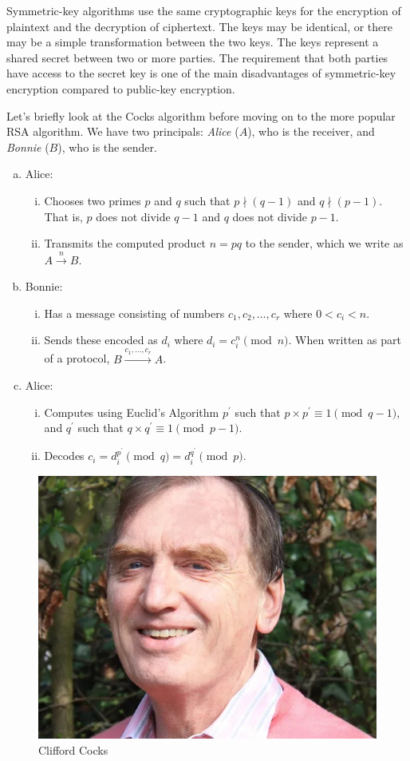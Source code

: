 Symmetric-key algorithms use the same cryptographic keys for the
encryption of plaintext and the decryption of ciphertext. The keys may
be identical, or there may be a simple transformation between the two
keys. The keys represent a shared secret between two or more parties.
The requirement that both parties have access to the secret key is one
of the main disadvantages of symmetric-key encryption compared to
public-key encryption.

Let's briefly look at the Cocks algorithm before moving on to the more
popular RSA algorithm.  We have two principals: \emph{Alice} ($A$), who is
the receiver, and \emph{Bonnie} ($B$), who is the sender.

\begin{enumerate}[(a)]
  \item Alice:
  \begin{enumerate}[i.]
    \item Chooses two primes $p$ and $q$ such that $p \nmid (q-1)$ and $q
    \nmid (p-1)$. That is, $p$ does not divide $q-1$ and $q$ does not
      divide $p -1$.
    \item Transmits the computed product $n = p q$ to the sender, which we
      write as $A \xrightarrow{n} B$.
  \end{enumerate}
  \item Bonnie:
  \begin{enumerate}[i.]
    \item Has a message consisting of numbers $c_1, c_2, \ldots, c_r$
      where $0 < c_i < n$.
    \item Sends these encoded as $d_i$ where $d_i = c_i^n \pmod{n}$.
      When written as part of a protocol, $B \xrightarrow{c_1, \ldots,
      c_r} A$.
  \end{enumerate}
  \item Alice:
  \begin{enumerate}[i.]
    \item Computes using Euclid's Algorithm $p^\prime$ such that
      $p\times p^\prime \equiv 1 \pmod{q-1}$, and $q^\prime$ such that
      $q\times q^\prime \equiv 1 \pmod{p-1}$.
    \item Decodes $c_i = d_i^{p^\prime} \pmod{q} = d_i^{q^\prime}
      \pmod{p}$.
  \end{enumerate}
\end{enumerate}

\begin{figure}[tbhp]
        \centering
\includegraphics[height=0.33\textwidth]{./images/cliff-cocks.jpg}
        \caption{Clifford Cocks}\label{fig:cocks}
\end{figure}

